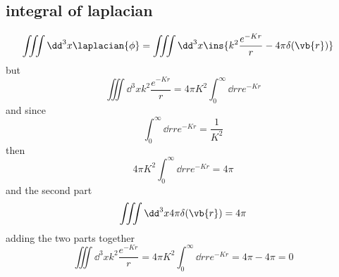 \subsection{integral of laplacian}
\begin{align}
  \iiint\dd^3x\laplacian{\phi} &= \iiint\dd^3x\ins{k^2\frac{e^{-Kr}}{r}-4\pi\delta(\vb{r})}
\end{align}
but
\begin{equation}
  \iiint\dd^3xk^2\frac{e^{-Kr}}{r} = 4\pi K^2 \int_{0}^{\infty}\dd r re^{-Kr}
\end{equation}
and since
\begin{equation}
  \int_{0}^{\infty}\dd r re^{-Kr} = \frac{1}{K^2}
\end{equation}
then
\begin{equation}
  4\pi K^2 \int_{0}^{\infty}\dd r re^{-Kr} = 4\pi
\end{equation}
and the second part
\begin{equation}
  \iiint\dd^3x 4\pi\delta(\vb{r}) = 4\pi
\end{equation}
adding the two parts together
\begin{equation}
  \iiint\dd^3xk^2\frac{e^{-Kr}}{r} = 4\pi K^2 \int_{0}^{\infty}\dd r re^{-Kr} = 4\pi-4\pi=0
\end{equation}